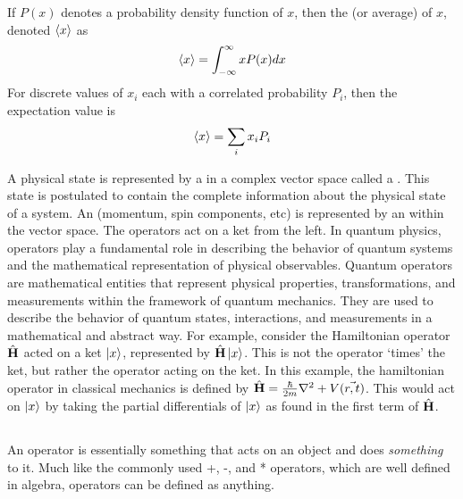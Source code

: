 \begin{defn}{1}
	If $P(x)$ denotes a probability density function of $x$, then the  (or average) of $x$, denoted $\braket{x}$ as
	\begin{align}
		\braket{x} = \int_{-\infty}^{\infty}xP(x) dx \label{expectation Value equation}
	\end{align}
	For discrete values of $x_i$ each with a correlated probability $P_i$, then the expectation value is 
	\begin{align}
		\braket{x} = \sum_{i}x_iP_i \label{expectation Value equation discrete}
	\end{align}
\end{defn}
 
A physical state is represented by a  in a complex vector space called a . This state is postulated to contain the complete information about the physical state of a system. An  (momentum, spin components, etc) is represented by an  within the vector space. The operators act on a ket from the left. In quantum physics, operators play a fundamental role in describing the behavior of quantum systems and the mathematical representation of physical observables. Quantum operators are mathematical entities that represent physical properties, transformations, and measurements within the framework of quantum mechanics. They are used to describe the behavior of quantum states, interactions, and measurements in a mathematical and abstract way. For example, consider the Hamiltonian operator $\hat{\text{\textbf{H}}}$ acted on a ket $\ket{x}$, represented by $\hat{\text{\textbf{H}}}\ket{x}$. This is not the operator `times' the ket, but rather the operator acting on the ket. In this example, the hamiltonian operator in classical mechanics is defined by $\hat{\text{\textbf{H}}} = \frac{\hbar}{2m}\nabla^2+V(\vec{r,t})$. This would act on $\ket{x}$ by taking the partial differentials of $\ket{x}$ as found in the first term of $\hat{\text{\textbf{H}}}$.





\subsection{}

An operator is essentially something that acts on an object and does \textit{something} to it. Much like the commonly used +, -, and * operators, which are well defined in algebra, operators can be defined as anything.

